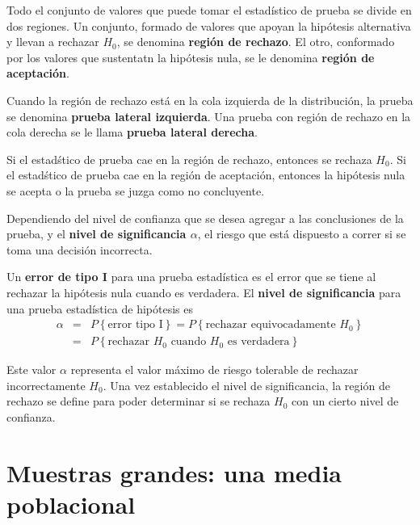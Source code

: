 Todo el conjunto de valores que puede tomar el estad\'istico de prueba se divide en dos regiones. Un conjunto, formado de valores que apoyan la hip\'otesis alternativa y llevan a rechazar $H_{0}$, se denomina \textbf{regi\'on de rechazo}. El otro, conformado por los valores que sustentatn la hip\'otesis nula, se le denomina \textbf{regi\'on de aceptaci\'on}.\medskip

Cuando la regi\'on de rechazo est\'a en la cola izquierda de la distribuci\'on, la  prueba se denomina \textbf{prueba lateral izquierda}. Una prueba con regi\'on de rechazo en la cola derecha se le llama \textbf{prueba lateral derecha}.\medskip

Si el estad\'stico de prueba cae en la regi\'on de rechazo, entonces se rechaza $H_{0}$. Si el estad\'stico de prueba cae en la regi\'on de aceptaci\'on, entonces la hip\'otesis nula se acepta o la prueba se juzga como no concluyente.\medskip

Dependiendo del nivel de confianza que se desea agregar a las conclusiones de la prueba, y el \textbf{nivel de significancia $\alpha$}, el riesgo que est\'a dispuesto a correr si se toma una decisi\'on incorrecta.

\begin{Def}
Un \textbf{error de tipo I} para una prueba estad\'istica es el error que se tiene al rechazar la hip\'otesis nula cuando es verdadera. El \textbf{nivel de significancia} para una prueba estad\'istica de hip\'otesis es
\begin{eqnarray*}
\alpha&=&P\left\{\textrm{error tipo I}\right\}=P\left\{\textrm{rechazar equivocadamente }H_{0}\right\}\\
&=&P\left\{\textrm{rechazar }H_{0}\textrm{ cuando }H_{0}\textrm{ es verdadera}\right\}
\end{eqnarray*}

\end{Def}

Este valor $\alpha$ representa el valor m\'aximo de riesgo tolerable de rechazar incorrectamente $H_{0}$. Una vez establecido el nivel de significancia, la regi\'on de rechazo se define para poder determinar si se rechaza $H_{0}$ con un cierto nivel de confianza.
\section*{Muestras grandes: una media poblacional}

